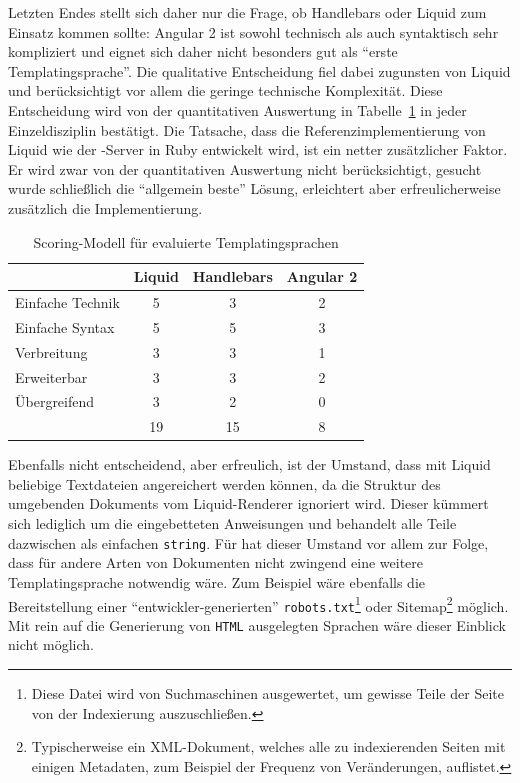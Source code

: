 Letzten Endes stellt sich daher nur die Frage, ob Handlebars oder Liquid zum Einsatz kommen sollte: Angular 2 ist sowohl technisch als auch syntaktisch sehr kompliziert und eignet sich daher nicht besonders gut als "`erste Templatingsprache"'. Die qualitative Entscheidung fiel dabei zugunsten von Liquid und berücksichtigt vor allem die geringe technische Komplexität. Diese Entscheidung wird von der quantitativen Auswertung in Tabelle~\ref{tab:scoring-templating-language} in jeder Einzeldisziplin bestätigt. Die Tatsache, dass die Referenzimplementierung von Liquid wie der \idename{}-Server in Ruby entwickelt wird, ist ein netter zusätzlicher Faktor. Er wird zwar von der quantitativen Auswertung nicht berücksichtigt, gesucht wurde schließlich die "`allgemein beste"' Lösung, erleichtert aber erfreulicherweise zusätzlich die Implementierung.

\begin{table}[h]
  \centering
  \begin{tabular}{ l c c c }
                      & Liquid   & Handlebars      & Angular 2   \\
    \hline
    Einfache Technik  & 5        & 3               & 2           \\
    Einfache Syntax   & 5        & 5               & 3           \\
    Verbreitung       & 3        & 3               & 1           \\
    Erweiterbar       & 3        & 3               & 2           \\
    Übergreifend      & 3        & 2               & 0           \\
    \hline \hline
                      & 19       & 15              & 8
  \end{tabular}
  \caption{Scoring-Modell für evaluierte Templatingsprachen}
  \label{tab:scoring-templating-language}
\end{table}

Ebenfalls nicht entscheidend, aber erfreulich, ist der Umstand, dass mit Liquid beliebige Textdateien angereichert werden können, da die Struktur des umgebenden Dokuments vom Liquid-Renderer ignoriert wird. Dieser kümmert sich lediglich um die eingebetteten Anweisungen und behandelt alle Teile dazwischen als einfachen \texttt{string}. Für \idename{} hat dieser Umstand vor allem zur Folge, dass für andere Arten von Dokumenten nicht zwingend eine weitere Templatingsprache notwendig wäre. Zum Beispiel wäre ebenfalls die Bereitstellung einer "`entwickler-generierten"' \texttt{robots.txt}\footnote{Diese Datei wird von Suchmaschinen ausgewertet, um gewisse Teile der Seite von der Indexierung auszuschließen.} oder Sitemap\footnote{Typischerweise ein XML-Dokument, welches alle zu indexierenden Seiten mit einigen Metadaten, zum Beispiel der Frequenz von Veränderungen, auflistet.} möglich. Mit rein auf die Generierung von \texttt{HTML} ausgelegten Sprachen wäre dieser Einblick nicht möglich.

